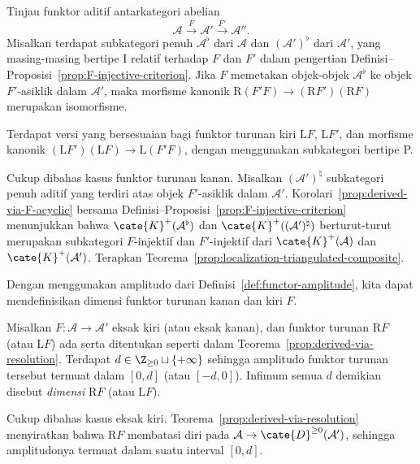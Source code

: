 \begin{teorema}\label{prop:derived-composite}
	Tinjau funktor aditif antarkategori abelian
	\[ \mathcal{A} \xrightarrow{F} \mathcal{A}' \xrightarrow{F'} \mathcal{A}''. \]
	Misalkan terdapat subkategori penuh $\mathcal{A}^\flat$ dari $\mathcal{A}$
	dan $(\mathcal{A}')^\flat$ dari $\mathcal{A}'$, yang masing-masing bertipe I
	relatif terhadap $F$ dan $F'$ dalam pengertian
	Definisi--Proposisi~\ref{prop:F-injective-criterion}. Jika $F$ memetakan
	objek-objek $\mathcal{A}^\flat$ ke objek $F'$-asiklik dalam $\mathcal{A}'$,
	maka morfisme kanonik
	$\mathrm{R}(F'F)\to(\mathrm{R}F')(\mathrm{R}F)$ merupakan isomorfisme.

	Terdapat versi yang bersesuaian bagi funktor turunan kiri $\mathrm{L}F$,
	$\mathrm{L}F'$, dan morfisme kanonik
	$(\mathrm{L}F')(\mathrm{L}F)\to\mathrm{L}(F'F)$, dengan menggunakan
	subkategori bertipe P.
\end{teorema}
\begin{bukti}
	Cukup dibahas kasus funktor turunan kanan. Misalkan
	$(\mathcal{A}')^\natural$ subkategori penuh aditif yang terdiri atas objek
	$F'$-asiklik dalam $\mathcal{A}'$.
	Korolari~\ref{prop:derived-via-F-acyclic} bersama
	Definisi--Proposisi~\ref{prop:F-injective-criterion} menunjukkan bahwa
	$\cate{K}^+(\mathcal{A}^\flat)$ dan
	$\cate{K}^+((\mathcal{A}')^\natural)$ berturut-turut merupakan subkategori
	$F$-injektif dan $F'$-injektif dari $\cate{K}^+(\mathcal{A})$ dan
	$\cate{K}^+(\mathcal{A}')$. Terapkan
	Teorema~\ref{prop:localization-triangulated-composite}.
\end{bukti}

Dengan menggunakan amplitudo dari Definisi~\ref{def:functor-amplitude}, kita
dapat mendefinisikan dimensi funktor turunan kanan dan kiri $F$.

\begin{definisi-proposisi}\label{def:dim-functor}
	Misalkan $F:\mathcal{A}\to\mathcal{A}'$ eksak kiri (atau eksak kanan), dan
	funktor turunan $\mathrm{R}F$ (atau $\mathrm{L}F$) ada serta ditentukan
seperti dalam Teorema~\ref{prop:derived-via-resolution}. Terdapat
$d\in\Z_{\geq0}\sqcup\{+\infty\}$ sehingga amplitudo funktor turunan tersebut
termuat dalam $[0,d]$ (atau $[-d,0]$). Infimum semua $d$ demikian disebut
\emph{dimensi} $\mathrm{R}F$ (atau $\mathrm{L}F$).
\end{definisi-proposisi}
\begin{bukti}
	Cukup dibahas kasus eksak kiri. Teorema~\ref{prop:derived-via-resolution}
	menyiratkan bahwa $\mathrm{R}F$ membatasi diri pada
	$\mathcal{A}\to\cate{D}^{\geq0}(\mathcal{A}')$, sehingga amplitudonya
	termuat dalam suatu interval $[0,d]$.
\end{bukti}

